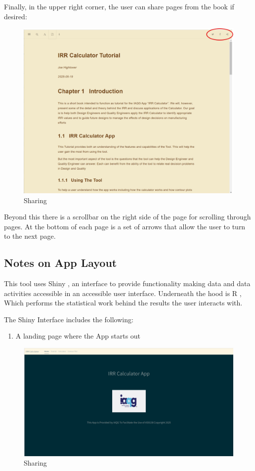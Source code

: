 \documentclass[
]{article}
\providecommand{\tightlist}{%
  \setlength{\itemsep}{0pt}\setlength{\parskip}{0pt}}
\begin{document}
Finally, in the upper right corner, the user can share pages from the book if desired:

\begin{figure}

{\centering \includegraphics[width=0.5\linewidth]{Sharing} 

}

\caption{Sharing}\label{fig:unnamed-chunk-7}
\end{figure}

Beyond this there is a scrollbar on the right side of the page for scrolling through pages. At the bottom of each page is a set of arrows that allow the user to turn to the next page.

\subsection{Notes on App Layout}\label{notes-on-app-layout}

This tool uses Shiny \citep{R-Shiny}, an interface to provide functionality making data and data activities accessible in an accessible user interface. Underneath the hood is R \citep{R-base}, Which performs the statistical work behind the results the user interacts with.

The Shiny Interface includes the following:

\begin{enumerate}
\def\labelenumi{\arabic{enumi}.}
\tightlist
\item
  A landing page where the App starts out
\end{enumerate}

\begin{figure}

{\centering \includegraphics[width=0.5\linewidth]{Landing_Page} 

}

\caption{Sharing}\label{fig:unnamed-chunk-8}
\end{figure}
\end{document}
